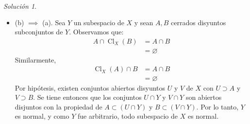 \documentclass[notitlepage]{report}
\theoremstyle{definition}
\theoremstyle{remark}
\newtheorem*{sol}{Solución}
\newcommand{\lrp}[1]{\left( #1 \right)}
\newcommand{\operatorclausure}[2]{\operatorname{Cl}_{#1}\lrp{#2}}
\begin{document}
\begin{sol}
\begin{itemize}
		\item (b) $ \implies  $ (a). Sea $ Y $ un subespacio de $ X $ y sean $ A,B $ cerrados disyuntos subconjuntos de $ Y $. Observamos que:
		\begin{align*}
		A \cap \operatorclausure{X}{B} &= A \cap B \\
		&= \varnothing
		\end{align*}
		Similarmente,
		\begin{align*}
		\operatorclausure{X}{A} \cap B &= A \cap B \\
		&= \varnothing
		\end{align*}
		Por hipótesis, existen conjuntos abiertos disyuntos $ U $ y $ V $ de $ X $ con $  U \supset A $ y $ V \supset B $. Se tiene entonces que los conjuntos $ U \cap Y $ y $ V \cap Y $ son abiertos disjuntos con la propiedad de $ A \subset \lrp{U \cap Y} $ y $ B \subset \lrp{V \cap Y} $. Por lo tanto, $ Y $ es normal, y como $ Y $ fue arbitrario, todo subespacio de $ X $ es normal.
	\end{itemize}
	
\end{sol}
\end{document}
